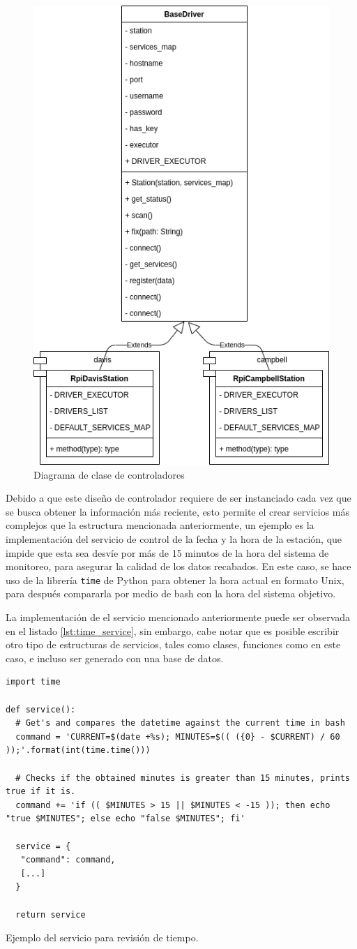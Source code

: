 \begin{figure}[!ht]
	\centering
	\includegraphics[width=0.5\linewidth]{images/diagrams/classes/drivers.drawio.png}
	\caption{Diagrama de clase de controladores}
	\label{fig:diagrama_clase_drivers}
\end{figure}

Debido a que este diseño de controlador requiere de ser instanciado cada vez que se busca obtener la información más reciente, esto permite el crear servicios más complejos que la estructura mencionada anteriormente, un ejemplo es la implementación del servicio de control de la fecha y la hora de la estación, que impide que esta sea desvíe por más de 15 minutos de la hora del sistema de monitoreo, para asegurar la calidad de los datos recabados. En este caso, se hace uso de la librería \texttt{time} de Python para obtener la hora actual en formato Unix, para después compararla por medio de bash con la hora del sistema objetivo.

La implementación de el servicio mencionado anteriormente puede ser observada en el listado \ref{lst:time_service}, sin embargo, cabe notar que es posible escribir otro tipo de estructuras de servicios, tales como clases, funciones como en este caso, e incluso ser generado con una base de datos.

\begin{listing}
\begin{verbatim}
import time

def service():
  # Get's and compares the datetime against the current time in bash
  command = 'CURRENT=$(date +%s); MINUTES=$(( ({0} - $CURRENT) / 60 ));'.format(int(time.time()))

  # Checks if the obtained minutes is greater than 15 minutes, prints true if it is.
  command += 'if (( $MINUTES > 15 || $MINUTES < -15 )); then echo "true $MINUTES"; else echo "false $MINUTES"; fi'

  service = {
   "command": command,
   [...]
  }

  return service
\end{verbatim}
\caption{Ejemplo del servicio para revisión de tiempo.}
\label{lst:time_service}
\end{listing}

